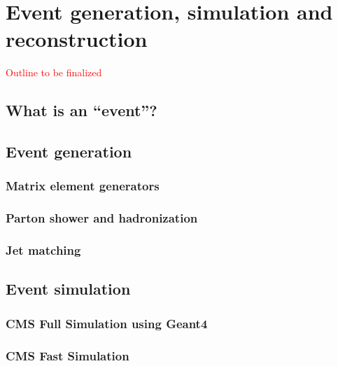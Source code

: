 \chapter{Event generation, simulation and reconstruction \label{chap:event_generation}}

\textcolor{red}{Outline to be finalized}

\section{What is an ``event''? \label{sec:event}}


\section{Event generation \label{sec:event_generation}}


\subsection{Matrix element generators}

\subsection{Parton shower and hadronization}

\subsection{Jet matching}


\section{Event simulation \label{sec:event_simulation}}

\subsection{CMS Full Simulation using Geant4 \label{subsec:fullsim}}


\subsection{CMS Fast Simulation \label{subsec:fastsim}}

